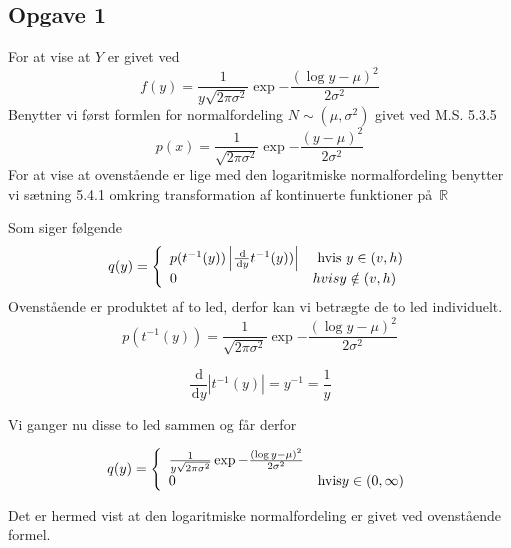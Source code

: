 \subsection{Opgave 1}

\newcommand{\ud}{\, \mathrm{d}}

For at vise at $Y$ er givet ved
\[
 f(y) = \frac{1}{y \sqrt{2\pi \sigma^{2}}} \exp{-\frac{(\log y - \mu)^{2}}{2\sigma^{2}}}
\]
Benytter vi f\o rst formlen for normalfordeling $N \sim (\mu,
\sigma^{2})$ givet ved M.S. 5.3.5
\[
p(x) = \frac{1}{\sqrt{2\pi\sigma^2}}\exp{-\frac{(y - \mu)^{2}}{2\sigma^{2}}}
\]
For at vise at ovenst\aa ende er lige med den logaritmiske
normalfordeling benytter vi s\ae tning 5.4.1 omkring transformation af
kontinuerte funktioner p\aa\ $\mathbb{R}$

Som siger f\o lgende
\[
q(y) = \left\{
\begin{array}{l l}
 p(t^{-1}(y))\left| \frac{\ud}{\ud y} t^{-1}(y)) \right| & \textrm{ hvis } y \in (v,h) \\
 0 & hvis y \notin (v,h)
\end{array}
\right.
\]
Ovenst\aa ende er produktet af to led, derfor kan vi betr\ae gte de to
led individuelt.
\[
p(t^{-1}(y)) = \frac{1}{\sqrt{2\pi\sigma^{2}}} \exp{-\frac{(\log y - \mu)^{2}}{2\sigma^{2}}}
\]

\[
\frac{\ud}{\ud y}\left| t^{-1}(y) \right| = y^{-1} = \frac{1}{y}
\]

Vi ganger nu disse to led sammen og f\aa r derfor

\[
q(y) = \left\{
\begin{array}{l l}
\frac{1}{y \sqrt{2\pi\sigma^{2}}} \exp{-\frac{(\log y - \mu)^{2}}{2\sigma^{2}}} & {} \\ %
0 & \textrm{hvis} y \in (0, \infty)
\end{array}
\right.
\]

Det er hermed vist at den logaritmiske normalfordeling er givet ved ovenst\aa ende formel.

